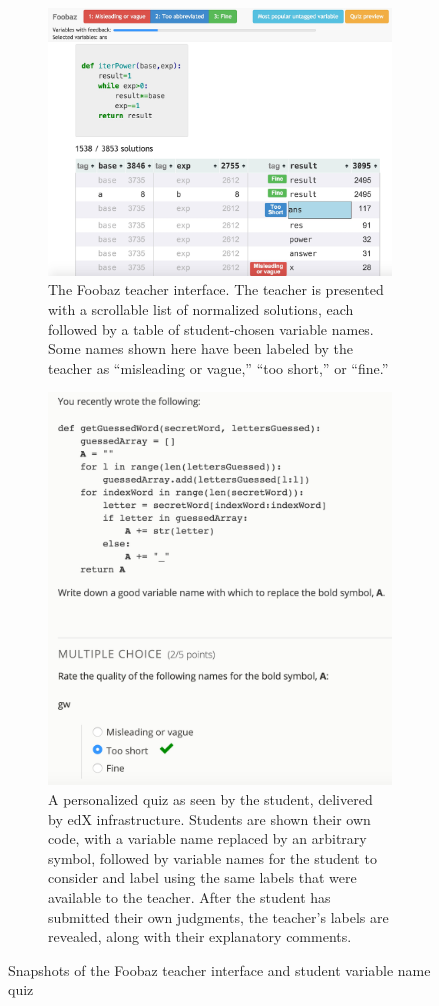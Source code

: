 \begin{figure}[p]

\begin{subfigure}[b]{1.0\textwidth}
\centering
\includegraphics[width=0.75\linewidth]{Body/figures/foobaz/FoobazInitialView4.jpg}
\caption{The Foobaz teacher interface. The teacher is presented with a scrollable list of normalized solutions, each followed by a table of student-chosen variable names. Some names shown here have been labeled by the teacher as ``misleading or vague,'' ``too short,'' or ``fine.''}
\label{fig:foobaz_teacherview}
\end{subfigure}

\begin{subfigure}[b]{1.0\textwidth}
\centering
\includegraphics[width=0.4\linewidth]{Body/figures/foobaz/feedbackQuizExample.png}
\caption{A personalized quiz as seen by the student, delivered by edX infrastructure. Students are shown their own code, with a variable name replaced by an arbitrary symbol, followed by variable names for the student to consider and label using the same labels that were available to the teacher. After the student has submitted their own judgments, the teacher’s labels are revealed, along with their explanatory comments.}
\label{fig:foobaz_studentview}
\end{subfigure}

\caption{Snapshots of the Foobaz teacher interface and student variable name quiz}
\end{figure}


